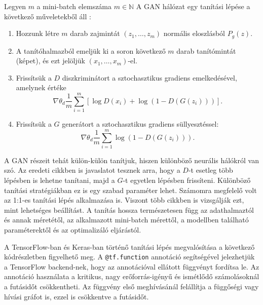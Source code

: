 
Legyen $m$ a mini-batch elemszáma $m \in \mathbb{N}$
A GAN hálózat egy tanítási lépése a következő műveletekből áll \cite{goodfellow2014generative}:
\begin{enumerate}
\item Hozzunk létre $m$ darab zajmintát $(z_1, \ldots, z_m)$ normális eloszlásból $P_g(z)$.
\item A tanítóhalmazból emeljük ki a soron következő $m$ darab tanítómintát (képet), és ezt jelöljük $(x_1, \ldots, x_m)$-el. %
\item Frissítsük a $D$ diszkriminátort a sztochasztikus gradiens emelkedésével, amelynek értéke
$$ \nabla \theta_d \frac{1}{m} \sum_{i=1}^{m} \left[\log D(x_i) + \log(1 - D(G(z_i))) \right].$$
\item  Frissítsük a $G$ generátort a sztochasztikus gradiens süllyesztéssel:
$$ \nabla \theta_d \frac{1}{m} \sum_{i=1}^{m} \log(1 - D(G(z_i))).$$
\end{enumerate}

A GAN részeit tehát külön-külön tanítjuk, hiszen különböző neurális hálókról van szó. Az eredeti cikkben is javaslatot tesznek arra, hogy a $D$-t esetleg több lépésben is lehetne tanítani, majd a $G$-t egyetlen lépésben frissíteni.
Különböző tanítási stratégiákban ez is egy szabad paraméter lehet. Számomra megfelelő volt az 1:1-es tanítási lépés alkalmazása is. Viszont több cikkben is vizsgálják ezt, mint lehetséges beállítást.
A tanítás hossza természetesen függ az adathalmaztól és annak méretétől, az alkalmazott mini-batch mérettől, a modellben található paraméterektől és az optimalizáló eljárástól.

A TensorFlow-ban és Keras-ban történő tanítási lépés megvalósítása a következő kódrészletben figyelhető meg. A \texttt{@tf.function} annotáció segítségével jelezhetjük a TensorFlow backend-nek, hogy az annotációval ellátott függvényt fordítsa le. Az annotáció használata a kritikus, nagy erőforrás-igényű és ismétlődő számolásoknál a futásidőt csökkentheti. Az függvény első meghívásánál felállítja a függőségi vagy hívási gráfot is, ezzel is csökkentve a futásidőt.



